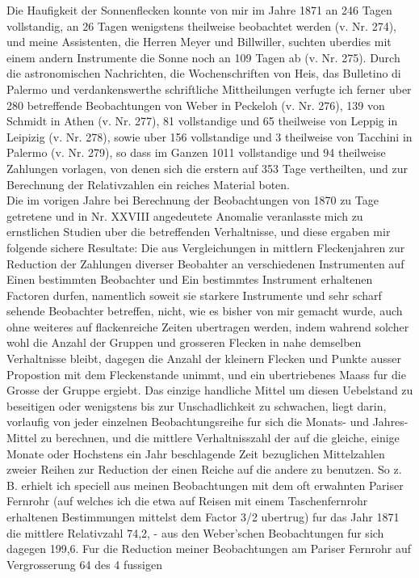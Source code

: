 \documentclass[12pt]{article}
\begin{document}
Die Haufigkeit der Sonnenflecken konnte von mir im Jahre 1871 an 246 Tagen vollstandig, an 26 Tagen wenigstens theilweise beobachtet werden (v. Nr. 274), und meine Assistenten, die Herren Meyer und Billwiller, suchten uberdies mit einem andern Instrumente die Sonne noch an 109 Tagen ab (v. Nr. 275). Durch die astronomischen Nachrichten, die Wochenschriften von Heis, das Bulletino di Palermo und verdankenswerthe schriftliche Mittheilungen verfugte ich ferner uber 280 betreffende Beobachtungen von Weber in Peckeloh (v. Nr. 276), 139 von Schmidt in Athen (v. Nr. 277), 81 vollstandige und 65 theilweise von Leppig in Leipizig (v. Nr. 278), sowie uber 156 vollstandige und 3 theilweise von Tacchini in Palermo (v. Nr. 279), so dass im Ganzen 1011 vollstandige und 94 theilweise Zahlungen vorlagen, von denen sich die erstern auf 353 Tage vertheilten, und zur Berechnung der Relativzahlen ein reiches Material boten.\\

Die im vorigen Jahre bei Berechnung der Beobachtungen von 1870 zu Tage getretene und in Nr. XXVIII angedeutete Anomalie veranlasste mich zu ernstlichen Studien uber die betreffenden Verhaltnisse, und diese ergaben mir folgende sichere Resultate: Die aus Vergleichungen in mittlern Fleckenjahren zur Reduction der Zahlungen diverser Beobahter an verschiedenen Instrumenten auf Einen bestimmten Beobachter und Ein bestimmtes Instrument erhaltenen Factoren durfen, namentlich soweit sie starkere Instrumente und sehr scharf sehende Beobachter betreffen, nicht, wie es bisher von mir gemacht wurde, auch ohne weiteres auf flackenreiche Zeiten ubertragen werden, indem wahrend solcher wohl die Anzahl der Gruppen und grosseren Flecken in nahe demselben Verhaltnisse bleibt, dagegen die Anzahl der kleinern Flecken und Punkte ausser Propostion mit dem Fleckenstande unimmt, und ein ubertriebenes Maass fur die Grosse der Gruppe ergiebt. Das einzige handliche Mittel um diesen Uebelstand zu beseitigen oder wenigstens bis zur Unschadlichkeit zu schwachen, liegt darin, vorlaufig von jeder einzelnen Beobachtungsreihe fur sich die Monats- und Jahres-Mittel zu berechnen, und die mittlere Verhaltnisszahl der auf die gleiche, einige Monate oder Hochstens ein Jahr beschlagende Zeit bezuglichen Mittelzahlen zweier Reihen zur Reduction der einen Reiche auf die andere zu benutzen. So z. B. erhielt ich speciell aus meinen Beobachtungen mit dem oft erwahnten Pariser Fernrohr (auf welches ich die etwa auf Reisen mit einem Taschenfernrohr erhaltenen Bestimmungen mittelst dem Factor 3/2 ubertrug) fur das Jahr 1871 die mittlere Relativzahl 74,2, - aus den Weber'schen Beobachtungen fur sich dagegen 199,6. Fur die Reduction meiner Beobachtungen am Pariser Fernrohr auf Vergrosserung 64 des 4 fussigen\\
\end{document}
